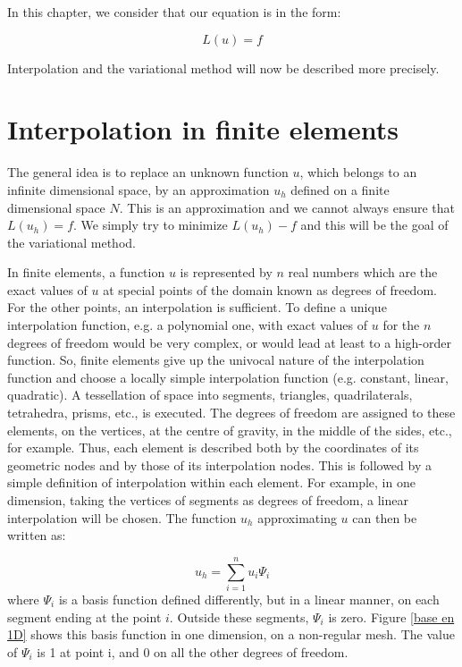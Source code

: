 In this chapter, we consider that our equation is in the form:%

\begin{equation}
L(u)=f
\end{equation}


Interpolation and the variational method will now be described more precisely.


\section{Interpolation in finite elements}

The general idea is to replace an unknown function $u$, which belongs to an
infinite dimensional space, by an approximation $u_{h}$ defined on a finite
dimensional space $N$. This is an approximation and we cannot always ensure
that $L(u_{h})=f$. We simply try to minimize $L(u_{h})-f$ and this will be the
goal of the variational method.

In finite elements, a function $u$ is represented by $n$ real numbers which
are the exact values of $u$ at special points of the domain known as degrees
of freedom. For the other points, an interpolation is sufficient. To define a
unique interpolation function, e.g. a polynomial one, with exact values of $u$
for the $n$ degrees of freedom would be very complex, or would lead at least
to a high-order function. So, finite elements give up the univocal nature of
the interpolation function and choose a locally simple interpolation function
(e.g. constant, linear, quadratic). A tessellation of space into segments,
triangles, quadrilaterals, tetrahedra, prisms, etc., is executed. The degrees
of freedom are assigned to these elements, on the vertices, at the centre of
gravity, in the middle of the sides, etc., for example. Thus, each element is
described both by the coordinates of its geometric nodes and by those of its
interpolation nodes. This is followed by a simple definition of interpolation
within each element. For example, in one dimension, taking the vertices of
segments as degrees of freedom, a linear interpolation will be chosen. The
function $u_{h}$ approximating $u$ can then be written as:%

\begin{equation}
u_{h}=\sum\limits_{i=1}^{n}u_{i}\Psi_{i}%
\end{equation}
where $\Psi_{i}$ is a basis function defined differently, but in a linear
manner, on each segment ending at the point $i$. Outside these segments,
$\Psi_{i}$ is zero. Figure \ref{base en 1D} shows this basis function in one
dimension, on a non-regular mesh. The value of $\Psi_{i}$ is 1 at point i, and
0 on all the other degrees of freedom.%

